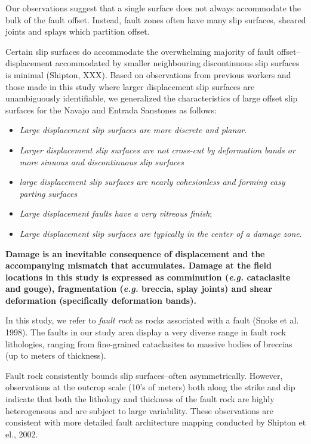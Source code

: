\documentclass[12pt,a4paper]{article}
\begin{document}
Our observations suggest that a single surface does not always accommodate the bulk of  the fault offset. Instead, fault zones often have many slip surfaces, sheared joints and splays which partition offset. 

Certain slip surfaces do accommodate the overwhelming majority of fault offset-- displacement accommodated by smaller neighbouring discontinuous slip surfaces is minimal (Shipton, XXX). Based on observations from previous workers and those made in this study where larger displacement slip surfaces are unambiguously identifiable, we generalized the characteristics of large offset slip surfaces for the Navajo and Entrada Sanstones as follows:

\begin{itemize}
	
	\item \textit{Large displacement slip surfaces are more discrete and planar}.
	
	\item \textit{Larger displacement slip surfaces are not cross-cut by deformation bands or more sinuous and discontinuous slip surfaces}
	
	\item \textit{large displacement slip surfaces are nearly cohesionless and forming easy parting surfaces}
	
	\item \textit{Large displacement faults have a very vitreous finish};
	
	\item \textit{Large displacement slip surfaces are typically in the center of a damage zone}. 
	
\end{itemize}




\textbf{Damage is an inevitable consequence of displacement and the accompanying mismatch that accumulates. Damage at the field locations in this study is expressed as comminution (\textit{e.g.} cataclasite and gouge), fragmentation (\textit{e.g.} breccia, splay joints) and shear deformation (specifically deformation bands).}

In this study, we refer to \textit{fault rock} as rocks  associated with a fault (Snoke et al. 1998). The faults in our study area display a very diverse range in fault rock lithologies, ranging from fine-grained cataclasites to massive  bodies of breccias (up to meters of thickness). 

Fault rock consistently bounds slip surfaces--often asymmetrically. However, observations at the outcrop scale (10’s of meters) both along the strike and dip indicate that both the lithology and thickness of the fault rock are highly heterogeneous and are subject to large variability. These observations are consistent with more detailed fault architecture mapping conducted by Shipton et el., 2002.  
\end{document}
